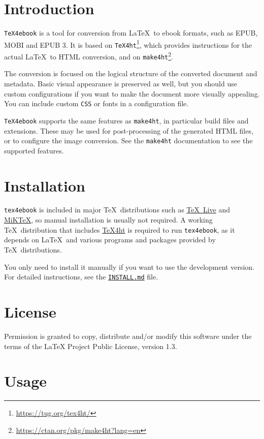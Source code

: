 \section{Introduction}\label{introduction}

\texttt{TeX4ebook} is a tool for conversion from \LaTeX~to ebook
formats, such as EPUB, MOBI and EPUB 3. It is based on
\texttt{TeX4ht}\footnote{\url{https://tug.org/tex4ht/}}, which provides
instructions for the actual \LaTeX~to HTML conversion, and on
\texttt{make4ht}\footnote{\url{https://ctan.org/pkg/make4ht?lang=en}}.

The conversion is focused on the logical structure of the converted
document and metadata. Basic visual appearance is preserved as well, but
you should use custom configurations if you want to make the document
more visually appealing. You can include custom \texttt{CSS} or fonts in
a configuration file.

\texttt{TeX4ebook} supports the same features as \texttt{make4ht}, in
particular build files and extensions. These may be used for
post-processing of the generated HTML files, or to configure the image
conversion. See the \texttt{make4ht} documentation to see the supported
features.

\section{Installation}\label{installation}

\texttt{tex4ebook} is included in major \TeX~distributions such as
\href{https://www.tug.org/texlive/}{\TeX~Live} and
\href{https://miktex.org/}{MiKTeX}, so manual installation is usually
not required. A working \TeX~distribution that includes
\href{https://tug.org/tex4ht/}{\TeX4ht} is required to run
\texttt{tex4ebook}, as it depends on \LaTeX~and various programs and
packages provided by \TeX~distributions.

You only need to install it manually if you want to use the development
version. For detailed instructions, see the
\href{./INSTALL.md}{\texttt{INSTALL.md}} file.

\section{License}\label{license}

Permission is granted to copy, distribute and/or modify this software
under the terms of the LaTeX Project Public License, version 1.3.

\section{Usage}\label{usage}

